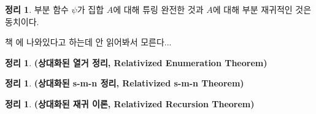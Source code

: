 \documentclass[b5paper, 11pt]{book}
\theoremstyle{definition}
\newtheorem{thm}[defn]{정리}
\newenvironment{pf*}{\pushQED{\qed}\pf}
{\popQED\endpf}
\begin{document}
\begin{thm}
    부분 함수 $\psi$가 집합 $A$에 대해 튜링 완전한 것과 $A$에 대해 부분 재귀적인 것은 동치이다.
\end{thm}
\begin{pf*}
    책 \cite{kleene1952introduction}에 나와있다고 하는데 안 읽어봐서 모른다...
\end{pf*}
\begin{thm}
    \textbf{(상대화된 열거 정리, Relativized Enumeration Theorem)}
\end{thm}
\begin{thm}
    \textbf{(상대화된 s-m-n 정리, Relativized s-m-n Theorem)}
\end{thm}
\begin{thm}
    \textbf{(상대화된 재귀 이론, Relativized Recursion Theorem)}
\end{thm}
\end{document}

